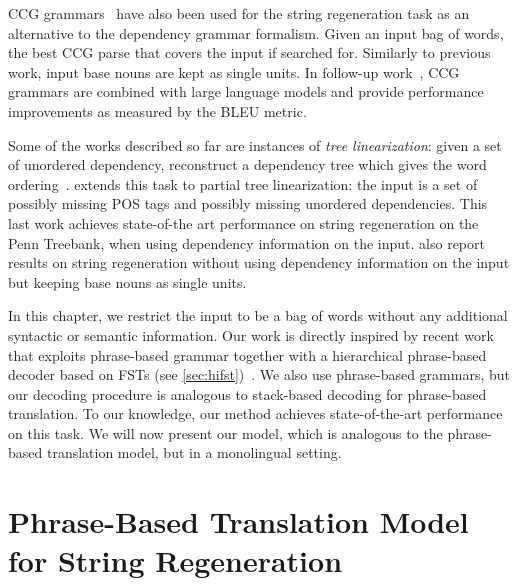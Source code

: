 CCG grammars~\citep{zhang-clark:2011:EMNLP} have also been used
for the string regeneration task as an alternative
to the dependency grammar formalism. Given an input bag
of words, the best CCG parse that covers the input if searched
for. Similarly to previous work, input base nouns are kept as
single units. In follow-up work~\citep{zhang-blackwood-clark:2012:EACL2012},
CCG grammars are combined with large language models
and provide performance improvements as measured by the BLEU
metric.

Some of the works described so far are instances of \emph{tree linearization}: given
a set of unordered dependency, reconstruct a dependency tree which gives
the word ordering~\citep{belz-bohnet-mille-wanner-white:2012:INLG}.
\citet{zhang:2013:IJCAI} extends this task to partial tree linearization: the
input is a set of possibly missing POS tags and possibly missing unordered
dependencies. This last work achieves state-of-the art performance on string regeneration
on the Penn Treebank, when using dependency information on the input.
\citet{zhang:2013:IJCAI} also report results on string regeneration without
using dependency information on the input but keeping base nouns as single
units.

In this chapter, we restrict the input to be a bag of words without any additional
syntactic or semantic information.
Our work is directly inspired by recent work that exploits phrase-based
grammar together with a hierarchical phrase-based decoder based on
FSTs (see \autoref{sec:hifst})~\citep{degispert-tomalin-byrne:2014:EACL}. We
also use phrase-based grammars, but
our decoding procedure is analogous to stack-based decoding for phrase-based
translation.
To our knowledge, our method achieves state-of-the-art performance
on this task. We will now present our model, which is analogous
to the phrase-based translation model, but in a monolingual setting.



\section{Phrase-Based Translation Model for String Regeneration}
\label{sec:gyroPhraseBasedModel}

